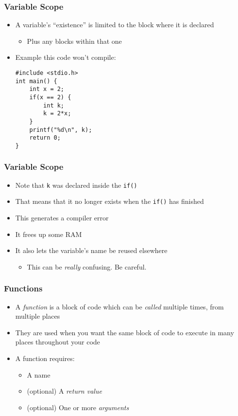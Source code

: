 \documentclass[14pt]{beamer}
\begin{document}
\begin{frame}[fragile]
\frametitle{Variable Scope}
\begin{itemize}
\item A variable's ``existence'' is limited to the block where it is declared
	\begin{itemize}
		\item Plus any blocks within that one
	\end{itemize}
\item Example this code won't compile:
\begin{lstlisting}[style=CStyle]
#include <stdio.h>
int main() {
	int x = 2;
	if(x == 2) {
		int k;
		k = 2*x;
	}
	printf("%d\n", k);
	return 0;
}
\end{lstlisting}
\end{itemize}
\end{frame}

\begin{frame}
\frametitle{Variable Scope}
\begin{itemize}
\item Note that \texttt{k} was declared inside the \texttt{if()}
\item That means that it no longer exists when the \texttt{if()} has finished
\item This generates a compiler error
\item It frees up some RAM
\item It also lets the variable's name be reused elsewhere
	\begin{itemize}
		\item This can be \textit{really} confusing. Be careful.
	\end{itemize}
\end{itemize}
\end{frame}

\begin{frame}
\frametitle{Functions}
\begin{itemize}
\item A \textit{function} is a block of code which can be \textit{called} multiple times, from multiple places
\item They are used when you want the same block of code to execute in many places throughout your code
\item A function requires:
	\begin{itemize}
		\item A name
		\item (optional) A \textit{return value}
		\item (optional) One or more \textit{arguments}
	\end{itemize}
\end{itemize}
\end{frame}
\end{document}
